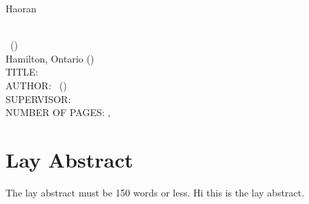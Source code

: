 \documentclass[
11pt, %
oneside, %
english, %
singlespacing, %
]{macthesis} %
\def\blankpage{%
      \clearpage%
      \thispagestyle{empty}%
      \addtocounter{page}{-1}%
      \null%
      \clearpage}
\begin{document}
\hfill\textemdash Haoran

\blankpage
\clearpage




\blankpage
\clearpage


\newpage
{} %
\setcounter{page}{2} %

\noindent %
\univname \\
\degreename\, (\the\year) \\
Hamilton, Ontario (\deptname) \\[1.5cm]
TITLE: \ttitle \\
AUTHOR: \authorname\,  %
(\univname)  \\
SUPERVISOR: \supname\, \\
NUMBER OF PAGES: \pageref{lastoffront}, \pageref{LastPage}  %

\clearpage

\section*{Lay Abstract}
  The lay abstract must be 150 words or less.
  Hi this is the lay abstract.
\end{document}
